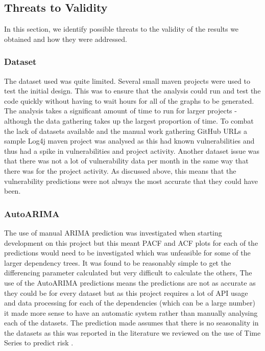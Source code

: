 \documentclass[conference]{IEEEtran}
\begin{document}
\subsection{Threats to Validity}
In this section, we identify possible threats to the validity of the results we obtained and how they were addressed. 

\subsubsection{Dataset}
The dataset used was quite limited. Several small maven projects were used to test the initial design. This was to ensure that the analysis could run and test the code quickly without having to wait hours for all of the graphs to be generated. The analysis takes a significant amount of time to run for larger projects - although the data gathering takes up the largest proportion of time. To combat the lack of datasets available and the manual work gathering GitHub URLs a sample Log4j maven project was analysed as this had known vulnerabilities and thus had a spike in vulnerabilities and project activity. Another dataset issue was that there was not a lot of vulnerability data per month in the same way that there was for the project activity. As discussed above, this means that the vulnerability predictions were not always the most accurate that they could have been. 

\subsubsection{AutoARIMA}
The use of manual ARIMA prediction was investigated when starting development on this project but this meant PACF and ACF plots for each of the predictions would need to be investigated which was unfeasible for some of the larger dependency trees. It was found to be reasonably simple to get the differencing parameter calculated but very difficult to calculate the others, The use of the AutoARIMA predictions means the predictions are not as accurate as they could be for every dataset but as this project requires a lot of API usage and data processing for each of the dependencies (which can be a large number) it made more sense to have an automatic system rather than manually analysing each of the datasets. The prediction made assumes that there is no seasonality in the datasets as this was reported in the literature we reviewed on the use of Time Series to predict risk \cite{roumani_time_2015}. 
\end{document}
